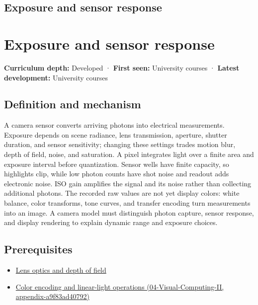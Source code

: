 \hypertarget{appendix-92d45cdf2afc}{}
\section*{Exposure and sensor response}
\chapter{Exposure and sensor response}\label{appendix-92d45cdf2afc-exposure-and-sensor-response}

\textbf{Curriculum depth:} Developed · \textbf{First seen:} University courses · \textbf{Latest development:} University courses

\section{Definition and mechanism}\label{appendix-92d45cdf2afc-definition-and-mechanism}

A camera sensor converts arriving photons into electrical measurements. Exposure depends on scene radiance, lens transmission, aperture, shutter duration, and sensor sensitivity; changing these settings trades motion blur, depth of field, noise, and saturation. A pixel integrates light over a finite area and exposure interval before quantization. Sensor wells have finite capacity, so highlights clip, while low photon counts have shot noise and readout adds electronic noise. ISO gain amplifies the signal and its noise rather than collecting additional photons. The recorded raw values are not yet display colors: white balance, color transforms, tone curves, and transfer encoding turn measurements into an image. A camera model must distinguish photon capture, sensor response, and display rendering to explain dynamic range and exposure choices.

\section{Prerequisites}\label{appendix-92d45cdf2afc-prerequisites}

\begin{itemize}
\tightlist
\item
  \hyperref[appendix-21f8456e2629]{Lens optics and depth of field}
\item
  \href{../04-Visual-Computing-II/main.pdf\#nameddest=appendix-a9f83ad40792}{Color encoding and linear-light operations (04-Visual-Computing-II, appendix-a9f83ad40792)}
\end{itemize}

